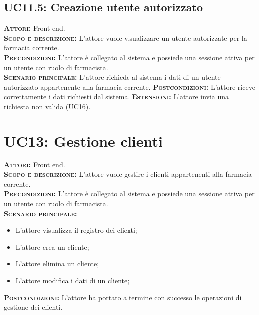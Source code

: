 \subsection{UC11.5: Creazione utente autorizzato}
\label{sec:UC115}
\textsc{\textbf{Attori:}} Front end.\\
\textsc{\textbf{Scopo e descrizione:}} L'attore vuole visualizzare un utente autorizzate per la farmacia corrente.\\
\textsc{\textsc{\textbf{Precondizioni:}}} L'attore è collegato al sistema e possiede una sessione attiva per un utente con ruolo di farmacista.\\
\textsc{\textbf{Scenario principale:}} L'attore richiede al sistema i dati di un utente autorizzato appartenente alla farmacia corrente.
\textsc{\textbf{Postcondizioni:}} L'attore riceve correttamente i dati richiesti dal sistema.
\textsc{\textbf{Estensioni:}} L'attore invia una richiesta non valida (\hyperref[sec:UC16]{UC16}).

\section{UC13: Gestione clienti}
\label{sec:UC13}
\textsc{\textbf{Attori:}} Front end.\\
\textsc{\textbf{Scopo e descrizione:}} L'attore vuole gestire i clienti appartenenti alla farmacia corrente.\\
\textsc{\textsc{\textbf{Precondizioni:}}} L'attore è collegato al sistema e possiede una sessione attiva per un utente con ruolo di farmacista.\\
\textsc{\textbf{Scenario principale:}}
\begin{itemize}
    \item L'attore visualizza il registro dei clienti;
    \item L'attore crea un cliente;
    \item L'attore elimina un cliente;
    \item L'attore modifica i dati di un cliente;
\end{itemize}
\textsc{\textbf{Postcondizioni:}} L'attore ha portato a termine con successo le operazioni di gestione dei clienti.

